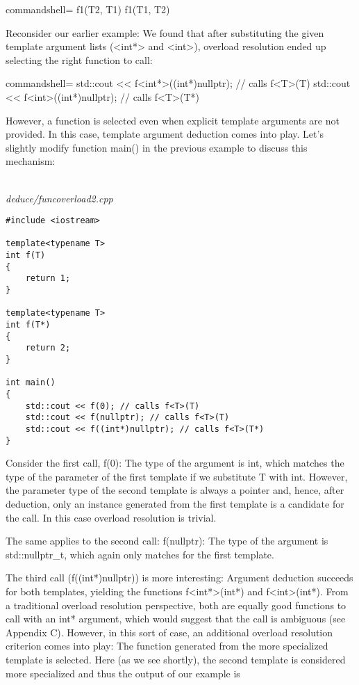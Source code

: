 \begin{tcblisting}{commandshell={}}
f1(T2, T1)
f1(T1, T2)
\end{tcblisting}


Reconsider our earlier example: We found that after substituting the given template argument lists (<int*> and <int>), overload resolution ended up selecting the right function to call:

\begin{tcblisting}{commandshell={}}
std::cout << f<int*>((int*)nullptr); // calls f<T>(T)
std::cout << f<int>((int*)nullptr); // calls f<T>(T*)
\end{tcblisting}

However, a function is selected even when explicit template arguments are not provided. In this case, template argument deduction comes into play. Let’s slightly modify function main() in the previous example to discuss this mechanism:

\hspace*{\fill} \\ %
\noindent
\textit{deduce/funcoverload2.cpp}
\begin{lstlisting}[style=styleCXX]
#include <iostream>

template<typename T>
int f(T)
{
	return 1;
}

template<typename T>
int f(T*)
{
	return 2;
}

int main()
{
	std::cout << f(0); // calls f<T>(T)
	std::cout << f(nullptr); // calls f<T>(T)
	std::cout << f((int*)nullptr); // calls f<T>(T*)
}
\end{lstlisting}

Consider the first call, f(0): The type of the argument is int, which matches the type of the parameter of the first template if we substitute T with int. However, the parameter type of the second template is always a pointer and, hence, after deduction, only an instance generated from the first template is a candidate for the call. In this case overload resolution is trivial.

The same applies to the second call: f(nullptr): The type of the argument is std::nullptr\_t, which again only matches for the first template.

The third call (f((int*)nullptr)) is more interesting: Argument deduction succeeds for both templates, yielding the functions f<int*>(int*) and f<int>(int*). From a traditional overload resolution perspective, both are equally good functions to call with an int* argument, which would suggest that the call is ambiguous (see Appendix C). However, in this sort of case, an additional overload resolution criterion comes into play: The function generated from the more specialized template is selected. Here (as we see shortly), the second template is considered more specialized and thus the output of our example is

